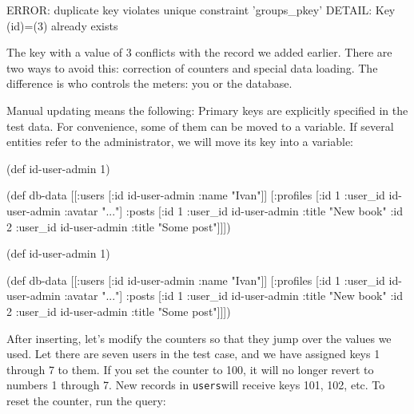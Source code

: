 \begin{english}
  \begin{text}
ERROR: duplicate key violates unique constraint 'groups_pkey'
DETAIL: Key (id)=(3) already exists
  \end{text}
\end{english}

\fi

The key with a value of 3 conflicts with the record we added earlier. There are two ways to avoid this: correction of counters and special data loading. The difference is who controls the meters: you or the database.

Manual updating means the following: Primary keys are explicitly specified in the test data. For convenience, some of them can be moved to a variable. If several entities refer to the administrator, we will move its key
into a variable:

\ifnarrow

\begin{english}
  \begin{clojure}
(def id-user-admin 1)

(def db-data
  [[:users [{:id id-user-admin
             :name "Ivan"}]]
   [:profiles [{:id 1
                :user_id id-user-admin
                :avatar "..."}]
    :posts [{:id 1
             :user_id id-user-admin
             :title "New book"}
            {:id 2
             :user_id id-user-admin
             :title "Some post"}]]])
  \end{clojure}
\end{english}

\else

\begin{english}
  \begin{clojure}
(def id-user-admin 1)

(def db-data
  [[:users [{:id id-user-admin :name "Ivan"}]]
   [:profiles [{:id 1 :user_id id-user-admin :avatar "..."}]
    :posts [{:id 1 :user_id id-user-admin :title "New book"}
            {:id 2 :user_id id-user-admin :title "Some post"}]]])
  \end{clojure}
\end{english}

\fi


After inserting, let's modify the counters so that they jump over the values we used. Let there are seven users in the test case, and we have assigned keys 1 through 7 to them. If you set the counter to 100, it will no longer revert to numbers 1 through 7. New records in \verb|users|will receive keys 101, 102, etc. To reset the counter,
run the query:

